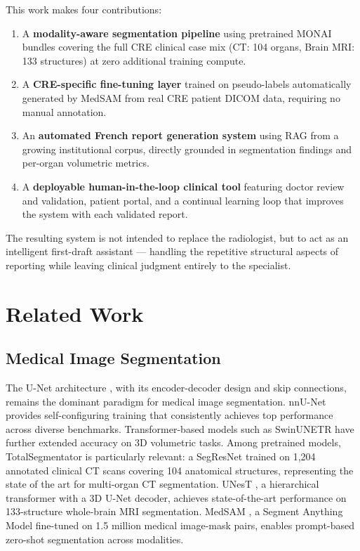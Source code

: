 \documentclass[conference]{IEEEtran}
\begin{document}
This work makes four contributions:
\begin{enumerate}
  \item A \textbf{modality-aware segmentation pipeline} using pretrained MONAI
        bundles covering the full CRE clinical case mix (CT: 104 organs,
        Brain MRI: 133 structures) at zero additional training compute.
  \item A \textbf{CRE-specific fine-tuning layer} trained on pseudo-labels
        automatically generated by MedSAM from real CRE patient DICOM data,
        requiring no manual annotation.
  \item An \textbf{automated French report generation system} using RAG from
        a growing institutional corpus, directly grounded in segmentation
        findings and per-organ volumetric metrics.
  \item A \textbf{deployable human-in-the-loop clinical tool} featuring doctor
        review and validation, patient portal, and a continual learning loop
        that improves the system with each validated report.
\end{enumerate}

The resulting system is not intended to replace the radiologist, but to act as
an intelligent first-draft assistant --- handling the repetitive structural
aspects of reporting while leaving clinical judgment entirely to the specialist.

\section{Related Work}

\subsection{Medical Image Segmentation}
The U-Net architecture \cite{ronneberger2015}, with its encoder-decoder design
and skip connections, remains the dominant paradigm for medical image
segmentation. nnU-Net \cite{isensee2021} provides self-configuring training
that consistently achieves top performance across diverse benchmarks.
Transformer-based models such as SwinUNETR have further extended accuracy on
3D volumetric tasks. Among pretrained models, TotalSegmentator \cite{wasserthal2023}
is particularly relevant: a SegResNet trained on 1{,}204 annotated clinical CT
scans covering 104 anatomical structures, representing the state of the art for
multi-organ CT segmentation. UNesT \cite{yu2023}, a hierarchical transformer
with a 3D U-Net decoder, achieves state-of-the-art performance on 133-structure
whole-brain MRI segmentation. MedSAM \cite{ma2024}, a Segment Anything Model
fine-tuned on 1.5 million medical image-mask pairs, enables prompt-based
zero-shot segmentation across modalities.
\end{document}
